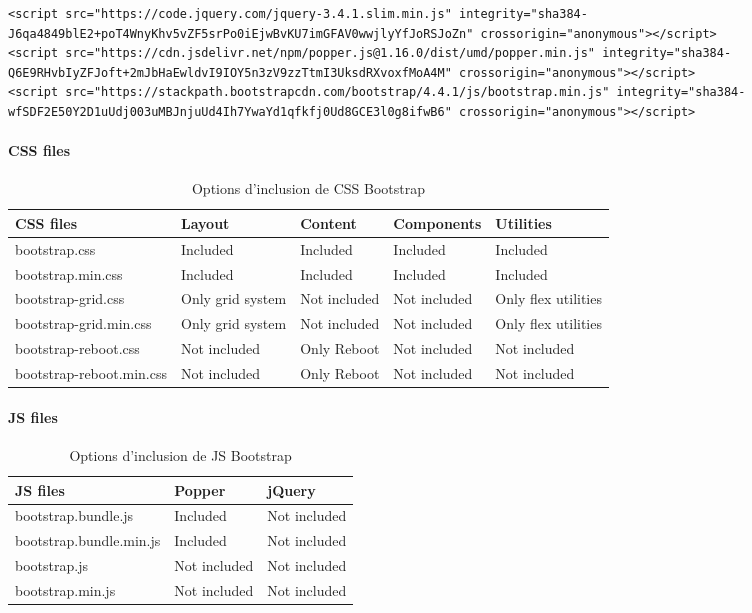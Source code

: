 \documentclass{report}
\begin{document}
\begin{multicols*}{2}
\begin{lstlisting}[style=CSSDraculaLight]
<script src="https://code.jquery.com/jquery-3.4.1.slim.min.js" integrity="sha384-J6qa4849blE2+poT4WnyKhv5vZF5srPo0iEjwBvKU7imGFAV0wwjlyYfJoRSJoZn" crossorigin="anonymous"></script>
<script src="https://cdn.jsdelivr.net/npm/popper.js@1.16.0/dist/umd/popper.min.js" integrity="sha384-Q6E9RHvbIyZFJoft+2mJbHaEwldvI9IOY5n3zV9zzTtmI3UksdRXvoxfMoA4M" crossorigin="anonymous"></script>
<script src="https://stackpath.bootstrapcdn.com/bootstrap/4.4.1/js/bootstrap.min.js" integrity="sha384-wfSDF2E50Y2D1uUdj003uMBJnjuUd4Ih7YwaYd1qfkfj0Ud8GCE3l0g8ifwB6" crossorigin="anonymous"></script>
\end{lstlisting}

\paragraph{CSS files}
\begin{table}[H]
    \centering
    \begin{tabular}{|l|l|l|l|l|}
        \hline
        \textbf{CSS files} & \textbf{Layout} & \textbf{Content} & \textbf{Components} & \textbf{Utilities} \\
        \hline
        bootstrap.css & Included & Included & Included & Included \\
        bootstrap.min.css & Included & Included & Included & Included \\
        bootstrap-grid.css & Only grid system & Not included & Not included & Only flex utilities \\
        bootstrap-grid.min.css & Only grid system & Not included & Not included & Only flex utilities \\
        bootstrap-reboot.css & Not included & Only Reboot & Not included & Not included \\
        bootstrap-reboot.min.css & Not included & Only Reboot & Not included & Not included \\
        \hline
    \end{tabular}
    \caption{Options d'inclusion de CSS Bootstrap}
\end{table}

\paragraph{JS files}
\begin{table}[H]
    \centering
    \begin{tabular}{|l|l|l|}
        \hline
        \textbf{JS files} & \textbf{Popper} & \textbf{jQuery} \\
        \hline
        bootstrap.bundle.js & Included & Not included \\
        bootstrap.bundle.min.js & Included & Not included \\
        bootstrap.js & Not included & Not included \\
        bootstrap.min.js & Not included & Not included \\
        \hline
    \end{tabular}
    \caption{Options d'inclusion de JS Bootstrap}
\end{table}


\end{multicols*}
\end{document}
